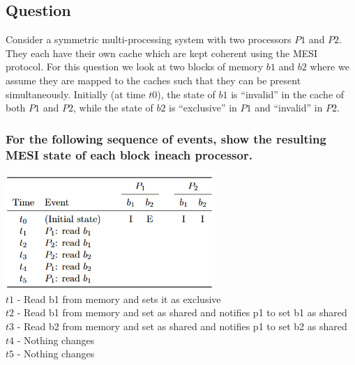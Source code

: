 \documentclass[12pt, a4paper]{article}
\begin{document}
		\subsection{Question}
			Consider a symmetric multi-processing system with two processors $P1$ and $P2$. They each have their own cache which are kept coherent using the MESI protocol. For this question we look at two blocks of memory $b1$ and $b2$ where we assume they are mapped to the caches such that they can be present simultaneously. Initially (at time $t0$), the state of $b1$ is “invalid” in the cache of both $P1$ and $P2$, while the state of $b2$ is “exclusive” in $P1$ and “invalid” in $P2$.
			\subsubsection{For the following sequence of events, show the resulting MESI state of each block ineach processor.}
				\includegraphics[width=300px]{assets/184.png}\\
				$t1$ - Read b1 from memory and sets it as exclusive\\
				$t2$ - Read b1 from memory and set as shared and notifies p1 to set b1 as shared\\
				$t3$ - Read b2 from memory and set as shared and notifies p1 to set b2 as shared\\
				$t4$ - Nothing changes\\
				$t5$ - Nothing changes
\end{document}
